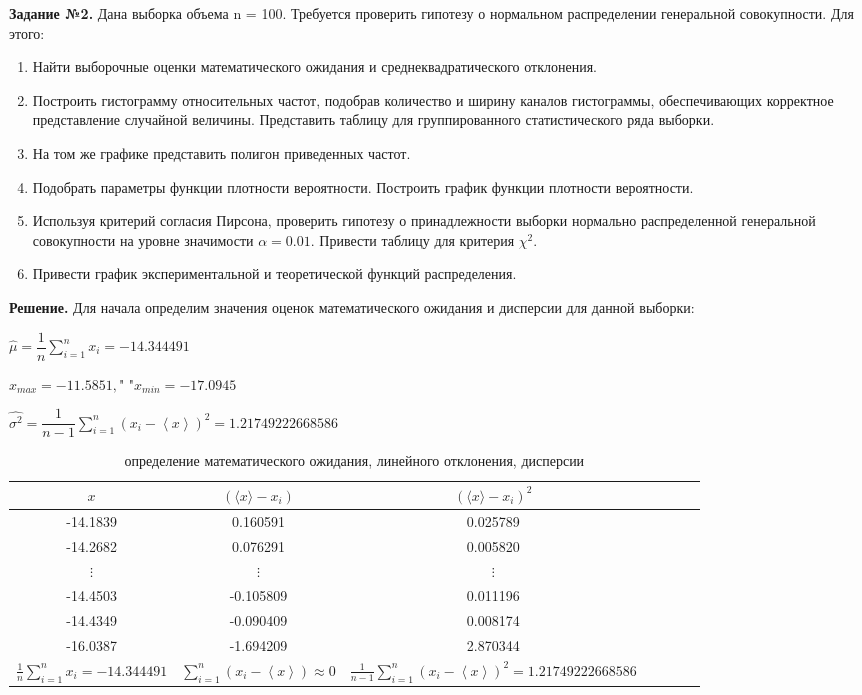 \documentclass[a4paper, 12pt]{article}
\begin{document}
	
	\quad \textbf{Задание №2.} Дана выборка объема n = 100. Требуется проверить гипотезу о нормальном
	распределении генеральной совокупности. Для этого:
	\begin{enumerate}
		\item Найти выборочные оценки математического ожидания и среднеквадратического
		отклонения.
		\item Построить гистограмму относительных частот, подобрав количество и ширину
		каналов гистограммы, обеспечивающих корректное представление случайной
		величины. Представить таблицу для группированного статистического ряда
		выборки.
		\item На том же графике представить полигон приведенных частот.
		\item Подобрать параметры функции плотности вероятности. Построить график функции
		плотности вероятности.
		\item Используя критерий согласия Пирсона, проверить гипотезу о принадлежности
		выборки нормально распределенной генеральной совокупности на уровне
		значимости $\alpha = 0.01$. Привести таблицу для критерия $\chi^2$.
		\item Привести график экспериментальной и теоретической функций распределения.
	\end{enumerate}
	
	\quad \textbf{Решение.} Для начала определим значения оценок математического ожидания и дисперсии для данной выборки:
	
	\begin{center}
		$ \hat{\mu}= \dfrac{1}{n} \sum\limits_{i=1}^n {x_i} = -14.344491 $
		
		$ x_{max} = -11.5851, \text{" "}x_{min} = -17.0945 $
		
		$ \hat{\sigma^2} = \dfrac{1}{n-1} \sum\limits_{i=1}^{n} (x_i - \left< x \right>)^2 = 1.21749222668586 $
		
		\begin{table}[h!]
			\centering
			\begin{tabular}{|c|c|c|c|c|c|c|}
				\hline
				$x$ & $(\langle x \rangle -x_i)$ & $(\langle x \rangle-x_i)^2$ \\
				\hline
				-14.1839 & 0.160591 & 0.025789 \\
				-14.2682 & 0.076291 & 0.005820 \\
				$\vdots$ & $\vdots$ & $\vdots$ \\
				-14.4503 & -0.105809 & 0.011196 \\
				-14.4349 & -0.090409 & 0.008174 \\
				-16.0387 & -1.694209 & 2.870344 \\
				\hline
				$\frac{1}{n} \sum\limits_{i=1}^n {x_i} = -14.344491$ & $\sum\limits_{i=1}^n (x_i-\left< x \right>) \approx 0$ & $\frac{1}{n-1} \sum\limits_{i=1}^{n} (x_i - \left< x \right>)^2 = 1.21749222668586$ \\
				\hline
			\end{tabular}
			\caption{определение математического ожидания, линейного отклонения, дисперсии}
		\end{table}
		
	\end{center}
	
\end{document}
